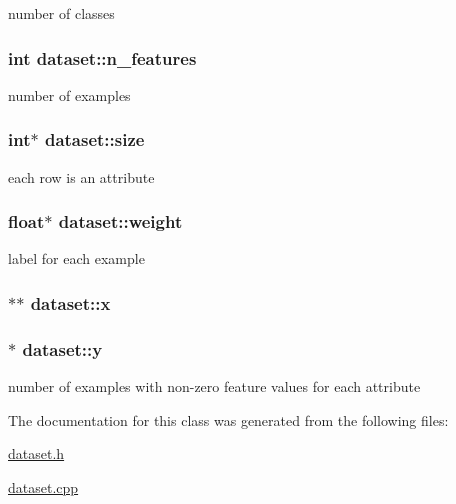 number of classes \hypertarget{classdataset_a5469ac8f1b5d64d836821e5056599b54}{
\subsubsection[{n\+\_\+features}]{\setlength{\rightskip}{0pt plus 5cm}int dataset\+::n\+\_\+features\hspace{0.3cm}{\ttfamily [private]}}}\label{classdataset_a5469ac8f1b5d64d836821e5056599b54}
number of examples \hypertarget{classdataset_acc18732fc7fbc0fcdebffac620646eb9}{
\subsubsection[{size}]{\setlength{\rightskip}{0pt plus 5cm}int$\ast$ dataset\+::size}}\label{classdataset_acc18732fc7fbc0fcdebffac620646eb9}
each row is an attribute \hypertarget{classdataset_ac6690ca832182b7cfa64da93a6ccd6ab}{
\subsubsection[{weight}]{\setlength{\rightskip}{0pt plus 5cm}float$\ast$ dataset\+::weight}}\label{classdataset_ac6690ca832182b7cfa64da93a6ccd6ab}
label for each example \hypertarget{classdataset_af7977ae76ce8f573f349e63f6500a8f8}{
\subsubsection[{x}]{$\ast$$\ast$ dataset\+::x}}\label{classdataset_af7977ae76ce8f573f349e63f6500a8f8}
\hypertarget{classdataset_a146d2d2d0eaadeb342e76b9bb1004881}{
\subsubsection[{y}]{$\ast$ dataset\+::y}}\label{classdataset_a146d2d2d0eaadeb342e76b9bb1004881}
number of examples with non-\/zero feature values for each attribute 

The documentation for this class was generated from the following files\+:\begin{DoxyCompactItemize}
\item 
\hyperlink{dataset_8h}{dataset.\+h}\item 
\hyperlink{dataset_8cpp}{dataset.\+cpp}\end{DoxyCompactItemize}
